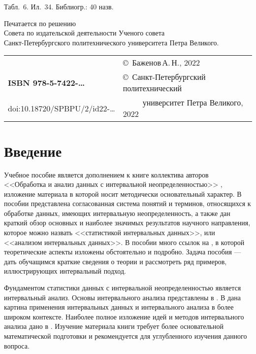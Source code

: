 \documentclass[a5paper,openany]{book}
\begin{document}
{{	
	\hfill \break
Табл.~6. Ил.~34. Библиогр.: 40 назв.
	\hfill \break
	\hfill \break
	
	\begin{center}
		{\small  	
			Печатается по решению\\
			Совета по издательской деятельности Ученого совета\\
			Санкт-Петербургского политехнического  университета Петра Великого. }
	\end{center}
	
	\hfill \break
	\begin{tabular}{ll}
		~ & \copyright  \ Баженов\,А.\,Н., 2022 \\
		{\bf ISBN 978-5-7422-\ldots} & \copyright \
		Санкт-Петербургский политехнический \\
		doi:10.18720/SPBPU/2/id22-\ldots &  ~~~~~университет Петра Великого, 2022
	\end{tabular}
	
	
	\thispagestyle{empty}

\newpage
\tableofcontents

\newpage

\listofexample 

\newpage


\newpage

	\chapter*{Введение}



Учебное пособие является дополнением к книге коллектива авторов
<<Обработка и анализ данных с интервальной неопределенностью>> \cite{MetodikaBook}, изложение материала в которой носит методически основательный характер.
В пособии представлена согласованная система понятий и терминов, относящихся к обработке данных, имеющих интервальную  неопределенность, а также
дан краткий обзор основных и наиболее значимых результатов научного направления, которое можно назвать <<статистикой интервальных данных>>, или <<анализом интервальных 
данных>>. В пособии много ссылок на  \cite{MetodikaBook}, в которой теоретические аспекты изложены обстоятельно и подробно.
Задача пособия --- дать обучащимся краткие сведения о теории и рассмотреть ряд примеров, иллюстрирующих интервальный подход. 


Фундаментом статистики данных с интервальной неопределенностью является интервальный анализ. 
Основы интервального анализа представлены в  \cite{SPbSTU2020}. В  \cite{SPbSTU2021} дана картина применения интервальных данных и интервального анализа в более широком контексте. 
Наиболее полное изложение идей и методов интервального анализа дано в  \cite{SSharyBook}. Изучение материала  книги  \cite{SSharyBook} требует более основательной математической подготовки и рекомендуется для углубленного изучения данного вопроса.

}}
\end{document}
